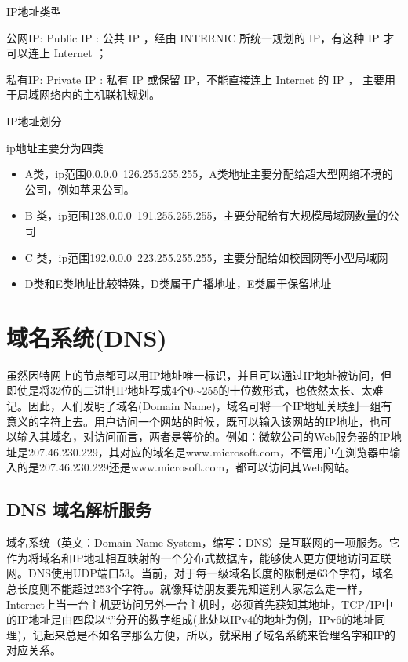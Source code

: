 \begin{ascolorbox5}{IP地址类型}
	\begin{ascboxB}{公网IP:}
Public IP : 公共 IP ，经由 INTERNIC 所统一规划的 IP，有这种 IP 才可以连上 Internet ；
\end{ascboxB}
	\begin{ascboxB}{私有IP:}
Private IP : 私有 IP 或保留 IP，不能直接连上 Internet 的 IP ， 主要用于局域网络内的主机联机规划。	
\end{ascboxB}
\end{ascolorbox5}
\begin{ascolorbox5}{IP地址划分}
	\begin{ascboxB}{ip地址主要分为四类}
\begin{itemize}
	\item A类，ip范围0.0.0.0~126.255.255.255，A类地址主要分配给超大型网络环境的公司，例如苹果公司。
	\item B 类，ip范围128.0.0.0~191.255.255.255，主要分配给有大规模局域网数量的公司
	\item C 类，ip范围192.0.0.0~223.255.255.255，主要分配给如校园网等小型局域网
	\item D类和E类地址比较特殊，D类属于广播地址，E类属于保留地址
\end{itemize}
	\end{ascboxB}
\end{ascolorbox5}

\section{域名系统(DNS)}
虽然因特网上的节点都可以用IP地址唯一标识，并且可以通过IP地址被访问，但即使是将32位的二进制IP地址写成4个0$\sim$255的十位数形式，也依然太长、太难记。因此，人们发明了域名(Domain Name)，域名可将一个IP地址关联到一组有意义的字符上去。用户访问一个网站的时候，既可以输入该网站的IP地址，也可以输入其域名，对访问而言，两者是等价的。例如：微软公司的Web服务器的IP地址是207.46.230.229，其对应的域名是www.microsoft.com，不管用户在浏览器中输入的是207.46.230.229还是www.microsoft.com，都可以访问其Web网站。
\subsection{DNS 域名解析服务}

域名系统（英文：Domain Name System，缩写：DNS）是互联网的一项服务。它作为将域名和IP地址相互映射的一个分布式数据库，能够使人更方便地访问互联网。DNS使用UDP端口53。当前，对于每一级域名长度的限制是63个字符，域名总长度则不能超过253个字符。。就像拜访朋友要先知道别人家怎么走一样，Internet上当一台主机要访问另外一台主机时，必须首先获知其地址，TCP/IP中的IP地址是由四段以“.”分开的数字组成(此处以IPv4的地址为例，IPv6的地址同理)，记起来总是不如名字那么方便，所以，就采用了域名系统来管理名字和IP的对应关系。


